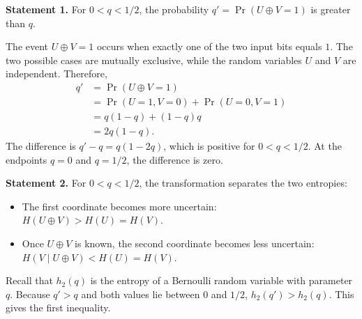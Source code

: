 \textbf{Statement 1.} For $0<q<1/2$, the probability $q'=\Pr(U\oplus V=1)$ is greater than $q$.

The event $U\oplus V=1$ occurs when exactly one of the two input bits equals $1$. The two possible cases are mutually exclusive, while the random variables $U$ and $V$ are independent. Therefore,
\begin{subequations}
\label{eq:xor-probability-derivation}
\begin{align}
q'
&=\Pr(U\oplus V=1)
\label{eq:xor-probability-definition}\\
&=\Pr(U=1,V=0)+\Pr(U=0,V=1)
\label{eq:xor-probability-cases}\\
&=q(1-q)+(1-q)q
\label{eq:xor-probability-independence}\\
&=2q(1-q).
\label{eq:xor-probability-result}
\end{align}
\end{subequations}
The difference is $q'-q=q(1-2q)$, which is positive for $0<q<1/2$. At the endpoints $q=0$ and $q=1/2$, the difference is zero.

\textbf{Statement 2.} For $0<q<1/2$, the transformation separates the two entropies:
\begin{itemize}
    \item[a)] The first coordinate becomes more uncertain: $H(U\oplus V)>H(U)=H(V)$.
    \item[b)] Once $U\oplus V$ is known, the second coordinate becomes less uncertain: $H(V\mid U\oplus V)<H(U)=H(V)$.
\end{itemize}

Recall that $h_2(q)$ is the entropy of a Bernoulli random variable with parameter $q$. Because $q'>q$ and both values lie between $0$ and $1/2$, $h_2(q')>h_2(q)$. This gives the first inequality.

